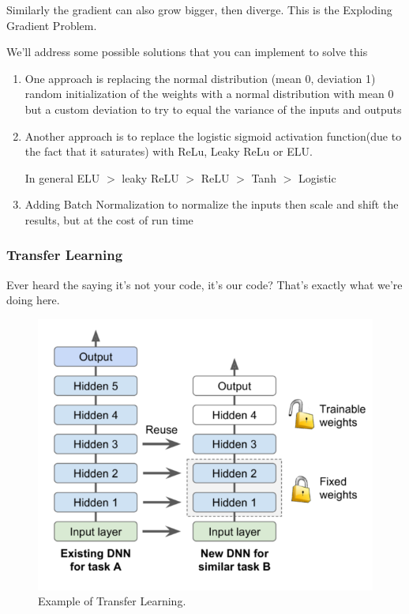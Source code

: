 \documentclass[article]{llncs}
\begin{document}
\noindent Similarly the gradient can also grow bigger, then diverge. This is the Exploding Gradient Problem.

\noindent We'll address some possible solutions that you can implement to solve this


\begin{enumerate}
    \item One approach is replacing the normal distribution (mean 0, deviation 1) random initialization of the weights with a normal distribution with mean 0 but a custom deviation to try to equal the variance of the inputs and outputs
    \item Another approach is to replace the logistic sigmoid activation function(due to the fact that it saturates) with ReLu, Leaky ReLu or ELU.
    
    In general ELU $>$ leaky ReLU $>$ ReLU $>$ Tanh $>$ Logistic
    \item Adding Batch Normalization to normalize the inputs then scale and shift the results, but at the cost of run time
\end{enumerate}

\subsubsection{Transfer Learning}
Ever heard the saying it's not your code, it's our code? That's exactly what we're doing here.


\begin{figure}[H]
\centering
\includegraphics[scale=0.60]{fig7.PNG}
\caption{Example of Transfer Learning.} \label{fig7}
\end{figure}
\end{document}
